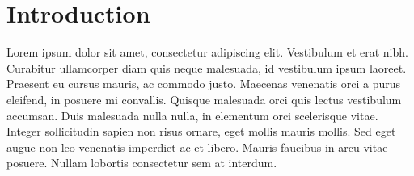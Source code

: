 \section{Introduction}

Lorem ipsum dolor sit amet, consectetur adipiscing elit. Vestibulum et erat nibh. Curabitur ullamcorper diam quis neque malesuada, id vestibulum ipsum laoreet. Praesent eu cursus mauris, ac commodo justo. Maecenas venenatis orci a purus eleifend, in posuere mi convallis. Quisque malesuada orci quis lectus vestibulum accumsan. Duis malesuada nulla nulla, in elementum orci scelerisque vitae. Integer sollicitudin sapien non risus ornare, eget mollis mauris mollis. Sed eget augue non leo venenatis imperdiet ac et libero. Mauris faucibus in arcu vitae posuere. Nullam lobortis consectetur sem at interdum.